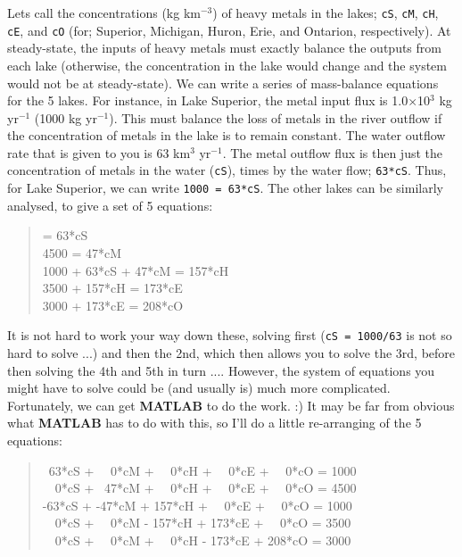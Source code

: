 \documentclass{tufte-book} %
\newenvironment{docspec}{\begin{quotation}\ttfamily\parskip0pt\parindent0pt\ignorespaces}{\end{quotation}}
\begin{document}
Lets call the concentrations (kg km\(^{-3}\)) of heavy metals in the lakes; \texttt{cS}, \texttt{cM}, \texttt{cH}, \texttt{cE}, and \texttt{cO} (for; Superior, Michigan, Huron, Erie, and Ontarion, respectively). At steady-state, the inputs of heavy metals must exactly balance the outputs from each lake (otherwise, the concentration in the lake would change and the system would not be at steady-state). We can write a series of mass-balance equations for the 5 lakes. For instance, in Lake Superior, the metal input flux is 1.0\(\times\)10\(^{3}\) kg yr\(^{-1}\) (1000 kg yr\(^{-1}\)). This must balance the loss of metals in the river outflow if the concentration of metals in the lake is to remain constant. The water outflow rate that is given to you is 63 km\(^{3}\) yr\(^{-1}\). The metal outflow flux is then just the concentration of metals in the water (\texttt{cS}), times by the water flow; \texttt{63*cS}. Thus, for Lake Superior, we can write \texttt{1000 = 63*cS}. The other lakes can be similarly analysed, to give a set of 5 equations:

\begin{docspec}
1000 = 63*cS 
\\4500 = 47*cM
\\1000 + 63*cS + 47*cM = 157*cH
\\3500 + 157*cH = 173*cE
\\3000 + 173*cE = 208*cO
\end{docspec}

It is not hard to work your way down these, solving first (\texttt{cS = 1000/63} is not so hard to solve ...) and then the 2nd, which then allows you to solve the 3rd, before then solving the 4th and 5th in turn .... However, the system of equations you might have to solve could be (and usually is) much more complicated. Fortunately, we can get \textbf{MATLAB} to do the work. :) It may be far from obvious what \textbf{MATLAB} has to do with this, so I'll do a little re-arranging of the 5 equations:

\begin{docspec}
\ 63*cS + \ \ 0*cM + \ \ 0*cH + \ \ 0*cE +  \ \ 0*cO = 1000
\\\ \ 0*cS + \ 47*cM + \ \  0*cH + \ \ 0*cE +  \ \ 0*cO = 4500
\\ -63*cS + -47*cM + 157*cH + \ \ 0*cE +  \ \ 0*cO = 1000 
\\\ \ 0*cS + \ \ 0*cM - 157*cH + 173*cE +  \ \ 0*cO = 3500
\\\ \ 0*cS + \ \ 0*cM + \ \ 0*cH - 173*cE + 208*cO = 3000 
\end{docspec}
\end{document}
